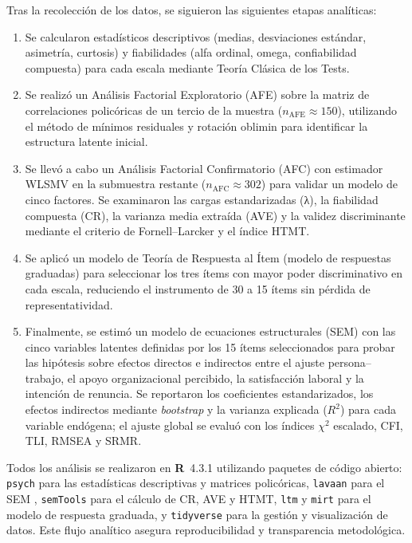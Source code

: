 Tras la recolección de los datos, se siguieron las siguientes etapas analíticas:

\begin{enumerate}
  \item Se calcularon estadísticos descriptivos (medias, desviaciones estándar, asimetría, curtosis) y fiabilidades (alfa ordinal, omega, confiabilidad compuesta) para cada escala mediante Teoría Clásica de los Tests.
  \item Se realizó un Análisis Factorial Exploratorio (AFE) sobre la matriz de correlaciones policóricas de un tercio de la muestra (\(n_{\text{AFE}}\approx 150\)), utilizando el método de mínimos residuales y rotación oblimin para identificar la estructura latente inicial.
  \item Se llevó a cabo un Análisis Factorial Confirmatorio (AFC) con estimador WLSMV en la submuestra restante (\(n_{\text{AFC}}\approx 302\)) para validar un modelo de cinco factores. Se examinaron las cargas estandarizadas (λ), la fiabilidad compuesta (CR), la varianza media extraída (AVE) y la validez discriminante mediante el criterio de Fornell–Larcker y el índice HTMT.
  \item Se aplicó un modelo de Teoría de Respuesta al Ítem (modelo de respuestas graduadas) para seleccionar los tres ítems con mayor poder discriminativo en cada escala, reduciendo el instrumento de 30 a 15 ítems sin pérdida de representatividad.
  \item Finalmente, se estimó un modelo de ecuaciones estructurales (SEM) con las cinco variables latentes definidas por los 15 ítems seleccionados para probar las hipótesis sobre efectos directos e indirectos entre el ajuste persona–trabajo, el apoyo organizacional percibido, la satisfacción laboral y la intención de renuncia. Se reportaron los coeficientes estandarizados, los efectos indirectos mediante \emph{bootstrap} y la varianza explicada (\(R^2\)) para cada variable endógena; el ajuste global se evaluó con los índices $\chi^2$ escalado, CFI, TLI, RMSEA y SRMR.
\end{enumerate}

Todos los análisis se realizaron en \textbf{R} 4.3.1 \cite{r_core_team_2023} utilizando paquetes de código abierto: \texttt{psych} para las estadísticas descriptivas y matrices policóricas, \texttt{lavaan} para el SEM \cite{rosseel_lavaan_2012}, \texttt{semTools} para el cálculo de CR, AVE y HTMT, \texttt{ltm} y \texttt{mirt} para el modelo de respuesta graduada, y \texttt{tidyverse} para la gestión y visualización de datos. Este flujo analítico asegura reproducibilidad y transparencia metodológica.

